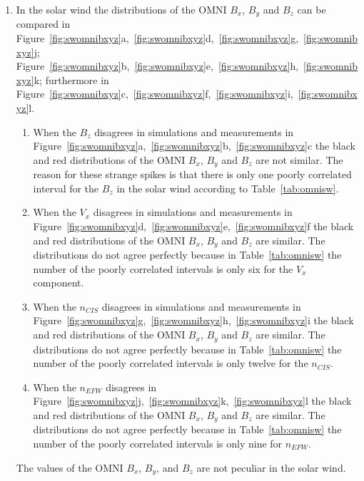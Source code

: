 \documentclass[linenumbers,draft]{agujournal}
\begin{document}
\begin{enumerate}
\item In the solar wind the distributions of the OMNI $B_{x}$, $B_{y}$ and $B_{z}$ can be compared in Figure~\ref{fig:swomnibxyz}a,~\ref{fig:swomnibxyz}d,~\ref{fig:swomnibxyz}g,~\ref{fig:swomnibxyz}j; Figure~\ref{fig:swomnibxyz}b,~\ref{fig:swomnibxyz}e,~\ref{fig:swomnibxyz}h,~\ref{fig:swomnibxyz}k; furthermore in Figure~\ref{fig:swomnibxyz}c,~\ref{fig:swomnibxyz}f,~\ref{fig:swomnibxyz}i,~\ref{fig:swomnibxyz}l.
\begin{enumerate}
\item When the $B_{z}$ disagrees in simulations and measurements in Figure~\ref{fig:swomnibxyz}a,~\ref{fig:swomnibxyz}b,~\ref{fig:swomnibxyz}c the black and red distributions of the OMNI $B_{x}$, $B_{y}$ and $B_{z}$ are not similar. The reason for these strange spikes is that there is only one poorly correlated interval for the $B_{z}$ in the solar wind according to Table~\ref{tab:omnisw}.

\item When the $V_{x}$ disagrees in simulations and measurements in Figure~\ref{fig:swomnibxyz}d,~\ref{fig:swomnibxyz}e,~\ref{fig:swomnibxyz}f the black and red distributions of the OMNI $B_{x}$, $B_{y}$ and $B_{z}$ are similar. The distributions do not agree perfectly because in Table~\ref{tab:omnisw} the number of the poorly correlated intervals is only six for the $V_{x}$ component.

\item When the $n_{CIS}$ disagrees in simulations and measurements in Figure~\ref{fig:swomnibxyz}g,~\ref{fig:swomnibxyz}h,~\ref{fig:swomnibxyz}i the black and red distributions of the OMNI $B_{x}$, $B_{y}$ and $B_{z}$ are similar. The distributions do not agree perfectly because in Table~\ref{tab:omnisw} the number of the poorly correlated intervals is only twelve for the $n_{CIS}$.
 
\item When the $n_{EFW}$ disagrees in Figure~\ref{fig:swomnibxyz}j,~\ref{fig:swomnibxyz}k,~\ref{fig:swomnibxyz}l the black and red distributions of the OMNI $B_{x}$, $B_{y}$ and $B_{z}$ are similar. The distributions do not agree perfectly because in Table~\ref{tab:omnisw} the number of the poorly correlated intervals is only nine for $n_{EFW}$.
\end{enumerate}
The values of the OMNI $B_{x}$, $B_{y}$, and $B_{z}$ are not peculiar in the solar wind.


\end{enumerate}
\end{document}
